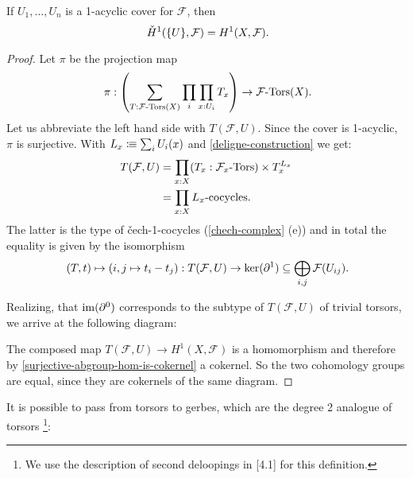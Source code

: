 \begin{theorem}%
  If $U_1,\dots,U_n$ is a 1-acyclic cover for $\mathcal F$, then
  \[
    \check{H}^1(\{U\},\mathcal F)=H^1(X,\mathcal F)\rlap{.}
  \]
\end{theorem}

\begin{proof}
  Let $\pi$ be the projection map
  \[
    \pi :
    \left(
      \sum_{T:\Tors{\mathcal F}(X)}\prod_{i}\prod_{x:U_i}T_x
    \right)
    \to \Tors{\mathcal F}(X)\rlap{.}
  \]
  Let us abbreviate the left hand side with $T(\mathcal F,U)$.
  Since the cover is 1-acyclic, $\pi$ is surjective.
  With $L_x\vcentcolon\mspace{-1.2mu}\equiv \sum_{i}U_i(x)$ and \cref{deligne-construction} we get:
  \begin{align*}
    T(\mathcal F,U)&=\prod_{x:X}(T_x:\Tors{\mathcal F_x})\times T_x^{L_x} \\
                   &=\prod_{x:X}\text{$L_x$-cocycles}
                     \rlap{.}
  \end{align*}
  The latter is the type of \v{c}ech-1-cocycles (\cref{chech-complex} (e))
  and in total the equality is given by the isomorphism
  \[
    (T,t) \mapsto (i,j\mapsto t_i - t_j) :
    T(\mathcal F,U)
    \to
    \ker(\partial^1)
    \subseteq
    \bigoplus_{i,j}\mathcal F(U_{ij})\rlap{.}
  \]

  Realizing, that $\operatorname{im}(\partial^0)$ corresponds to the subtype of $T(\mathcal F,U)$ of trivial torsors,
  we arrive at the following diagram:
  \begin{center}
  \end{center}
  The composed map $T(\mathcal F,U)\to H^1(X,\mathcal F)$ is a homomorphism
  and therefore by \cref{surjective-abgroup-hom-is-cokernel} a cokernel.
  So the two cohomology groups are equal, since they are cokernels of the same diagram.
\end{proof}

It is possible to pass from torsors to gerbes,
which are the degree 2 analogue of torsors
\footnote{We use the description of second deloopings in \cite{wärn2023eilenbergmaclane}[4.1] for this definition.}:

